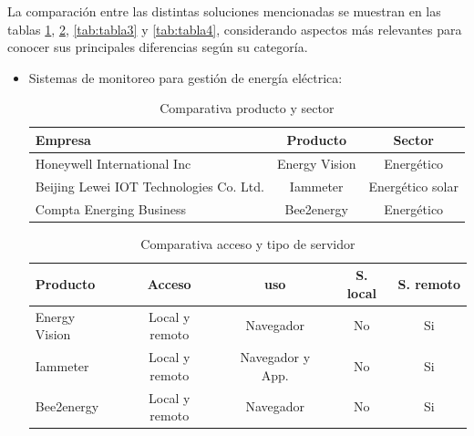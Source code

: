 La comparación entre las distintas soluciones mencionadas se muestran en las tablas \ref{tab:tabla1}, \ref{tab:tabla2},  \ref{tab:tabla3} y \ref{tab:tabla4}, considerando aspectos más relevantes para conocer sus principales diferencias según su categoría. 
\begin{itemize}
\item Sistemas de monitoreo para gestión de energía eléctrica:

\begin{table}[h]
	\centering
	\caption[Comparativa de soluciones entre producto y sector]{Comparativa producto y sector}
	\begin{tabular}{l c c }    
		\toprule
		\textbf{Empresa} 	& \textbf{Producto} & \textbf{Sector}  \\
		\midrule
		Honeywell International Inc & Energy Vision & Energético \\		
		Beijing Lewei IOT Technologies Co. Ltd.	 & Iammeter	& Energético solar \\
		Compta Energing Business	 & Bee2energy	& Energético \\
		\bottomrule
		\hline
	\end{tabular}
	\label{tab:tabla1}
\end{table}



\begin{table}[h]
	\centering
	\caption[Comparativa de soluciones entre acceso y servidor]{Comparativa acceso y tipo de servidor}
	\begin{tabular}{l c c c c }    
		\toprule
		\textbf{Producto} & \textbf{Acceso}  & \textbf{uso} & \textbf{S. local}   & \textbf{S. remoto} \\
		\midrule
		Energy Vision & Local y remoto 	& Navegador & No & Si  \\		
		Iammeter	 & Local y remoto	& Navegador y App. & No & Si  \\
		Bee2energy	 & Local y remoto	& Navegador & No & Si  \\
		\bottomrule
		\hline
	\end{tabular}
	\label{tab:tabla2}
\end{table}

\vspace{1cm}
\vspace{1cm}




\end{itemize}
